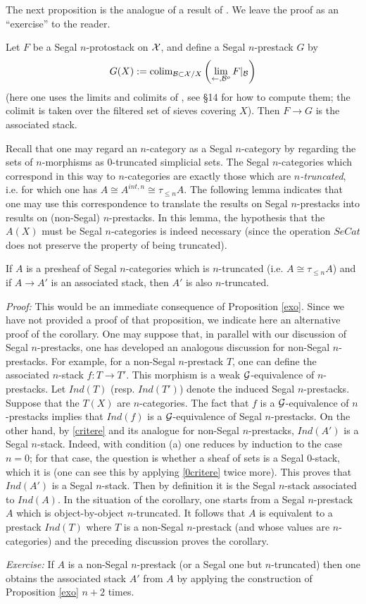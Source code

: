The next proposition is the analogue of a result of \cite{flexible}. We leave
the proof as an ``exercise'' to the reader.

\begin{proposition}
\label{exo}
Let $F$ be a Segal $n$-protostack on ${\cal X}$, and define a Segal $n$-prestack $G$
by
$$
G(X):= {\rm colim} _{{\cal B} \subset {\cal X} /X}\left( \lim _{\leftarrow , {\cal B} ^o}
F|_{{\cal B}} \right)
$$
(here one uses the limits and colimits of \cite{limits}, see \S 14 for how to
compute them; the colimit is taken over the filtered set of sieves covering
$X$). Then $F\rightarrow G$ is the associated stack.
\end{proposition}
\eop

Recall that one may regard an $n$-category as a Segal $n$-category by
regarding the sets of $n$-morphisms as $0$-truncated simplicial sets. The Segal
$n$-categories which correspond in this way to $n$-categories are exactly those
which are {\em $n$-truncated}, i.e. for which one has
$A\cong A^{int, n}\cong \tau _{\leq n}A$. The following lemma indicates that one
may use this correspondence to translate the results on Segal $n$-prestacks
into results on (non-Segal) $n$-prestacks.
In this lemma, the hypothesis that the $A(X)$ must be Segal $n$-categories is
indeed necessary (since the operation $SeCat$ does not preserve the property of
being truncated).


\begin{corollary}
\label{preservetronque}
If $A$ is a presheaf of Segal $n$-categories which is $n$-truncated (i.e.
$A\cong \tau _{\leq n}A$) and if $A\rightarrow A'$ is an associated stack, then
$A'$ is also $n$-truncated.
\end{corollary}
{\em Proof:} This would be an immediate consequence of
Proposition \ref{exo}.
Since we have not provided a proof of that proposition, we indicate here an
alternative proof of the corollary.
One may suppose that, in parallel with our discussion of Segal $n$-prestacks,
one has developed an analogous discussion for non-Segal $n$-prestacks.
For example, for a non-Segal $n$-prestack $T$, one can define the associated
$n$-stack $f:T\rightarrow T'$. This morphism is a weak ${\cal G}$-equivalence of
$n$-prestacks. Let $Ind(T)$ (resp. $Ind(T')$) denote the induced Segal
$n$-prestacks.
Suppose that the $T(X)$ are $n$-categories.
The fact that $f$ is a ${\cal G}$-equivalence of $n$-prestacks implies that
$Ind(f)$ is a ${\cal G}$-equivalence of Segal $n$-prestacks. On the other hand, by
\ref{critere} and its analogue for non-Segal $n$-prestacks, $Ind(A')$ is a
Segal $n$-stack. Indeed, with condition (a) one reduces by induction to the
case $n=0$; for that case, the question is whether a sheaf of sets is a Segal
$0$-stack, which it is (one can see this by applying \ref{0critere} twice
more). This proves that $Ind(A')$ is a Segal $n$-stack. Then by definition it is
the Segal $n$-stack associated to $Ind(A)$. In the situation of the corollary,
one starts from a Segal $n$-prestack $A$ which is object-by-object
$n$-truncated. It follows that $A$ is equivalent to a prestack $Ind(T)$ where
$T$ is a non-Segal $n$-prestack (and whose values are $n$-categories) and the
preceding discussion proves the corollary.
\eop

{\em Exercise:} If $A$ is a non-Segal $n$-prestack (or a Segal one but
$n$-truncated) then one obtains the associated stack $A'$ from $A$ by applying
the construction of Proposition \ref{exo} $n+2$ times.
